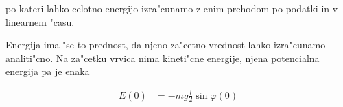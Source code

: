 \documentclass[a4paper,10pt]{article}
\renewcommand{\phi}{\varphi}
\begin{document}
po kateri lahko celotno energijo izra"cunamo z enim prehodom po podatki in v linearnem "casu. 

Energija ima "se to prednost, da njeno za"cetno vrednost lahko izra"cunamo analiti"cno. Na za"cetku vrvica nima kineti"cne energije, njena potencialna energija pa je enaka

\begin{align}
 E(0) &= - m g \frac{l}{2} \sin \phi(0)
\end{align}

\begin{comment}
\begin{figure}
 
\end{figure}

\end{comment}
\end{document}
